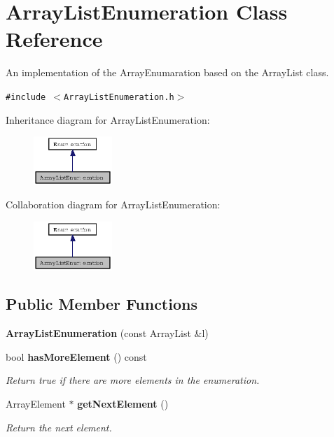 \section{Array\-List\-Enumeration Class Reference}
\label{classArrayListEnumeration}
An implementation of the Array\-Enumaration based on the Array\-List class.  


{\tt \#include $<$Array\-List\-Enumeration.h$>$}

Inheritance diagram for Array\-List\-Enumeration:\begin{figure}[H]
\begin{center}
\leavevmode
\includegraphics[width=84pt]{classArrayListEnumeration__inherit__graph}
\end{center}
\end{figure}
Collaboration diagram for Array\-List\-Enumeration:\begin{figure}[H]
\begin{center}
\leavevmode
\includegraphics[width=84pt]{classArrayListEnumeration__coll__graph}
\end{center}
\end{figure}
\subsection*{Public Member Functions}
\begin{CompactItemize}
\item 
\textbf{Array\-List\-Enumeration} (const Array\-List \&l)\label{classArrayListEnumeration_ab05789262170aa2c3df3a895b18540f}

\item 
bool {\bf has\-More\-Element} () const\label{classArrayListEnumeration_39325e1320707c1d90524ea1643d32c1}

\begin{CompactList}\small\item\em Return true if there are more elements in the enumeration. \item\end{CompactList}\item 
Array\-Element $\ast$ {\bf get\-Next\-Element} ()\label{classArrayListEnumeration_46c03d96b85c61cd3338646d57da5e8c}

\begin{CompactList}\small\item\em Return the next element. \item\end{CompactList}\end{CompactItemize}


